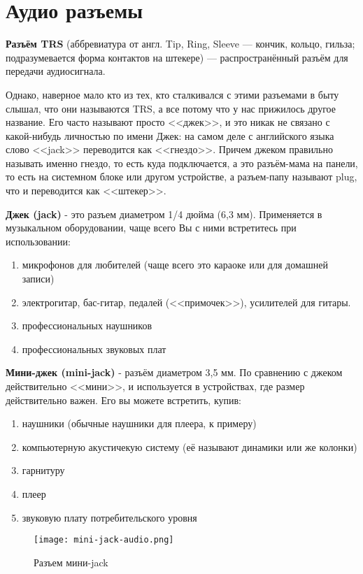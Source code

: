 \section{Аудио разъемы}

\textbf{Разъём TRS} (аббревиатура от англ. Tip, Ring, Sleeve — кончик, кольцо, гильза; подразумевается форма контактов на штекере) — распространённый разъём для передачи аудиосигнала. \cite{wiki-trs}

Однако, наверное мало кто из тех, кто сталкивался с этими разъемами в быту слышал, что они называются TRS, а все потому что у нас прижилось другое название. Его часто называют просто <<джек>>, и это никак не связано с какой-нибудь личностью по имени Джек: на самом деле с английского языка слово <<jack>> переводится как <<гнездо>>. Причем джеком правильно называть именно гнездо, то есть куда подключается, а это разъём-мама на панели, то есть на системном блоке или другом устройстве, а разъем-папу называют plug, что и переводится как <<штекер>>. \cite{kkg-jack}

\textbf{Джек (jack)} - это разъем диаметром 1/4 дюйма (6,3 мм). Применяется в музыкальном оборудовании, чаще всего Вы с ними встретитесь при использовании:
\begin{enumerate}
\item микрофонов для любителей (чаще всего это караоке или для домашней записи)
\item электрогитар, бас-гитар, педалей (<<примочек>>), усилителей для гитары.
\item профессиональных наушников
\item профессиональных звуковых плат
\end{enumerate}

\textbf{Мини-джек (mini-jack)} - разъём диаметром 3,5 мм. По сравнению с джеком действительно <<мини>>, и используется в устройствах, где размер действительно важен. Его вы можете встретить, купив:
\begin{enumerate}
\item наушники (обычные наушники для плеера, к примеру)
\item компьютерную акустичекую систему (её называют динамики или же колонки) 
\item гарнитуру
\item плеер
\item звуковую плату потребительского уровня
\end{enumerate}

\begin{figure}[h]
  \centering
  \texttt{[image: mini-jack-audio.png]}
  \caption{Разъем мини-jack}
  \label{image:mini-jack-audio}
\end{figure}

